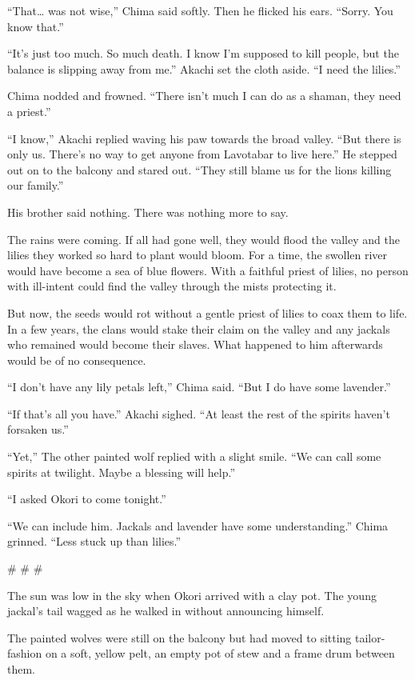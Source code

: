 ``That\ldots{} was not wise,'' Chima said softly. Then he flicked his ears. ``Sorry. You know that.''

``It's just too much. So much death. I know I'm supposed to kill people, but the balance is slipping away from me.'' Akachi set the cloth aside. ``I need the lilies.''

Chima nodded and frowned. ``There isn't much I can do as a shaman, they need a priest.''

``I know,'' Akachi replied waving his paw towards the broad valley. ``But there is only us. There's no way to get anyone from Lavotabar to live here.'' He stepped out on to the balcony and stared out. ``They still blame us for the lions killing our family.''

His brother said nothing. There was nothing more to say.

The rains were coming. If all had gone well, they would flood the valley and the lilies they worked so hard to plant would bloom. For a time, the swollen river would have become a sea of blue flowers. With a faithful priest of lilies, no person with ill-intent could find the valley through the mists protecting it.

But now, the seeds would rot without a gentle priest of lilies to coax them to life. In a few years, the clans would stake their claim on the valley and any jackals who remained would become their slaves. What happened to him afterwards would be of no consequence.

``I don't have any lily petals left,'' Chima said. ``But I do have some lavender.''

``If that's all you have.'' Akachi sighed. ``At least the rest of the spirits haven't forsaken us.''

``Yet,'' The other painted wolf replied with a slight smile. ``We can call some spirits at twilight. Maybe a blessing will help.''

``I asked Okori to come tonight.''

``We can include him. Jackals and lavender have some understanding.'' Chima grinned. ``Less stuck up than lilies.''

\# \# \#

The sun was low in the sky when Okori arrived with a clay pot. The young jackal's tail wagged as he walked in without announcing himself.

The painted wolves were still on the balcony but had moved to sitting tailor-fashion on a soft, yellow pelt, an empty pot of stew and a frame drum between them.

